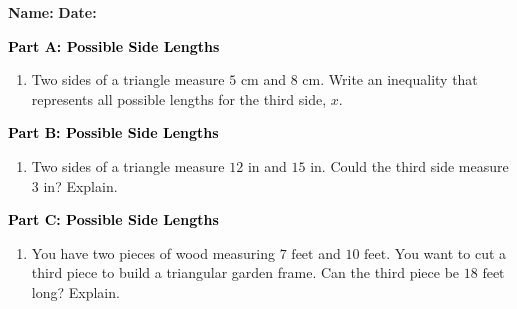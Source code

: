 \documentclass[12pt, letterpaper, fleqn]{article}
\begin{document}
\textbf{Name:} \underline{\hspace{5cm}}
\hfill
\textbf{Date:} \underline{\hspace{3cm}}\\

\begin{tcolorbox}[colback=customteal!20]
\large\textcolor{black}{\textbf{Part A: Possible Side Lengths}}
\end{tcolorbox}

\vspace{3mm}

\begin{enumerate}[itemsep=4.2cm, leftmargin=0.6cm]
\item Two sides of a triangle measure $5\text{ cm}$ and $8\text{ cm}$. Write an inequality that represents all possible lengths for the third side, $x$.
\end{enumerate}

\newpage

\begin{tcolorbox}[colback=customteal!20]
\large\textcolor{black}{\textbf{Part B: Possible Side Lengths}}
\end{tcolorbox}

\vspace{3mm}

\begin{enumerate}[itemsep=4.2cm, leftmargin=0.6cm, resume]
\item Two sides of a triangle measure $12\text{ in}$ and $15\text{ in}$. Could the third side measure $3\text{ in}$? Explain.
\end{enumerate}

\newpage

\begin{tcolorbox}[colback=customteal!20]
\large\textcolor{black}{\textbf{Part C: Possible Side Lengths}}
\end{tcolorbox}

\vspace{3mm}

\begin{enumerate}[itemsep=4.2cm, leftmargin=0.6cm, resume]
\item You have two pieces of wood measuring $7\text{ feet}$ and $10\text{ feet}$. You want to cut a third piece to build a triangular garden frame. Can the third piece be $18\text{ feet}$ long? Explain.
\end{enumerate}
\end{document}
